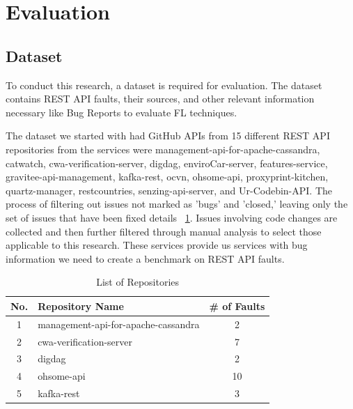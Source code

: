 \documentclass[conference]{IEEEtran}
\begin{document}
\section{Evaluation}
\label{sec:evaluation}

\subsection{Dataset}
\label{sec:dataset}

To conduct this research, a dataset is required for evaluation. The dataset contains REST API faults, their sources, and other relevant information necessary like Bug Reports to evaluate FL techniques.

The dataset we started with had  GitHub APIs from 15 different REST API repositories from the services were management-api-for-apache-cassandra, catwatch, cwa-verification-server, digdag, enviroCar-server, features-service,
gravitee-api-management, kafka-rest, ocvn, ohsome-api, proxyprint-kitchen, quartz-manager, restcountries, senzing-api-server, and Ur-Codebin-API.
The  process of filtering out issues not marked as 'bugs' and 'closed,' leaving only the set of issues that have been fixed details ~\ref{tab:repositories}. Issues involving code changes are collected and then further filtered through manual analysis to select those applicable to this research. These services provide us services with bug information we need to create a benchmark on REST API faults.

\begin{table}
    \centering
    \caption{List of Repositories}
    \label{tab:repositories}
    \begin{tabular}{|c|l|c|}
    \hline
        \hline
        \textbf{No.} & \textbf{Repository Name} & \textbf{\# of Faults} \\ \hline
        1 & management-api-for-apache-cassandra & 2 \\ \hline
        2 & cwa-verification-server &  7 \\ \hline
        3 & digdag & 2 \\ \hline
        4 & ohsome-api & 10 \\ \hline
        5 & kafka-rest & 3 \\ \hline
    \end{tabular}
\end{table}
    




\end{document}
